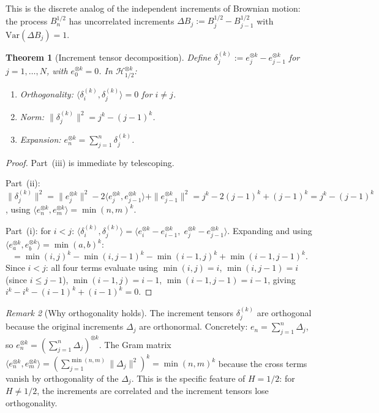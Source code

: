 \documentclass[11pt,a4paper]{article}
\theoremstyle{plain}
\newtheorem{theorem}{Theorem}[section]
\theoremstyle{definition}
\theoremstyle{remark}
\newtheorem{remark}[theorem]{Remark}
\newcommand{\Var}{\mathrm{Var}}
\begin{document}
This is the discrete analog of the independent increments
of Brownian motion: the process $B_n^{1/2}$ has
uncorrelated increments
$\Delta B_j := B_j^{1/2} - B_{j-1}^{1/2}$
with $\Var(\Delta B_j) = 1$.

\begin{theorem}[Increment tensor decomposition]
\label{thm:increment}
Define $\delta_j^{(k)} := e_j^{\otimes k}
- e_{j-1}^{\otimes k}$ for $j = 1,\ldots,N$,
with $e_0^{\otimes k} = 0$.  In
$\mathcal{H}_{1/2}^{\otimes k}$:
\begin{enumerate}[label=\textup{(\roman*)}]
\item \textup{Orthogonality:}
  $\langle \delta_i^{(k)}, \delta_j^{(k)} \rangle = 0$
  for $i \neq j$.
\item \textup{Norm:}
  $\|\delta_j^{(k)}\|^2 = j^k - (j{-}1)^k$.
\item \textup{Expansion:}
  $e_n^{\otimes k} = \sum_{j=1}^n \delta_j^{(k)}$.
\end{enumerate}
\end{theorem}

\begin{proof}
Part~(iii) is immediate by telescoping.

Part~(ii): $\|\delta_j^{(k)}\|^2
= \|e_j^{\otimes k}\|^2
- 2\langle e_j^{\otimes k}, e_{j-1}^{\otimes k}\rangle
+ \|e_{j-1}^{\otimes k}\|^2
= j^k - 2(j{-}1)^k + (j{-}1)^k
= j^k - (j{-}1)^k$,
using $\langle e_n^{\otimes k}, e_m^{\otimes k}\rangle
= \min(n,m)^k$.

Part~(i): for $i < j$:
$\langle \delta_i^{(k)}, \delta_j^{(k)} \rangle
= \langle e_i^{\otimes k} - e_{i-1}^{\otimes k},\;
  e_j^{\otimes k} - e_{j-1}^{\otimes k} \rangle$.
Expanding and using
$\langle e_a^{\otimes k}, e_b^{\otimes k}\rangle
= \min(a,b)^k$:
\[
  = \min(i,j)^k - \min(i,j{-}1)^k
  - \min(i{-}1,j)^k + \min(i{-}1,j{-}1)^k.
\]
Since $i < j$: all four terms evaluate using
$\min(i,j) = i$, $\min(i,j{-}1) = i$ (since
$i \leq j{-}1$), $\min(i{-}1,j) = i{-}1$,
$\min(i{-}1,j{-}1) = i{-}1$, giving
$i^k - i^k - (i{-}1)^k + (i{-}1)^k = 0$.
\end{proof}

\begin{remark}[Why orthogonality holds]
\label{rem:why-orth}
The increment tensors $\delta_j^{(k)}$ are orthogonal
because the original increments $\Delta_j$ are
orthonormal.  Concretely:
$e_n = \sum_{j=1}^n \Delta_j$, so
$e_n^{\otimes k} = (\sum_{j=1}^n \Delta_j)^{\otimes k}$.
The Gram matrix
$\langle e_n^{\otimes k}, e_m^{\otimes k}\rangle
= (\sum_{j=1}^{\min(n,m)} \|\Delta_j\|^2)^k = \min(n,m)^k$
because the cross terms vanish by orthogonality of the
$\Delta_j$.  This is the specific feature of $H = 1/2$:
for $H \neq 1/2$, the increments are correlated and the
increment tensors lose orthogonality.
\end{remark}
\end{document}
